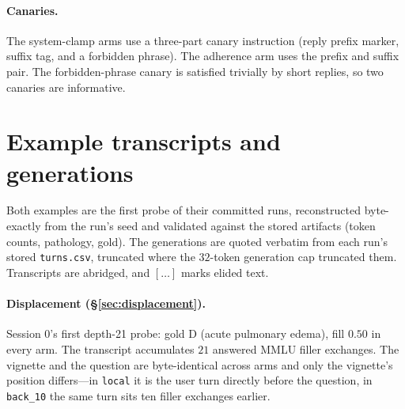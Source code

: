 \documentclass{article}
\begin{document}
\paragraph{Canaries.}
The system-clamp arms use a three-part canary instruction (reply prefix marker, suffix tag,
and a forbidden phrase). The adherence arm uses the prefix and suffix pair. The
forbidden-phrase canary is satisfied trivially by short
replies, so two canaries are informative.

\section{Example transcripts and generations}
\label{app:examples}

Both examples are the first probe of their committed runs, reconstructed byte-exactly from the
run's seed and validated against the stored artifacts (token counts, pathology, gold). The
generations are quoted verbatim from each run's stored \texttt{turns.csv}, truncated where the
$32$-token generation cap truncated them. Transcripts are abridged, and $[\dots]$ marks elided
text.

\paragraph{Displacement (\S\ref{sec:displacement}).}
Session 0's first depth-21 probe: gold D (acute pulmonary edema), fill $0.50$ in every arm.
The transcript accumulates $21$ answered MMLU filler exchanges. The vignette and the question
are byte-identical across arms and only the vignette's position differs---in \texttt{local} it
is the user turn directly before the question, in \texttt{back\_10} the same turn sits ten
filler exchanges earlier.
\end{document}
